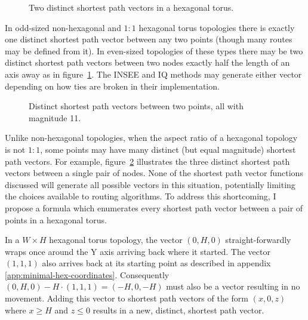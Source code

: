 			\begin{figure}
				\center
				
				\caption{Two distinct shortest path vectors in a hexagonal torus.}
				\label{fig:wrap-alternatives}
			\end{figure}
			
			In odd-sized non-hexagonal and $1:1$ hexagonal torus topologies there is
			exactly one distinct shortest path vector between any two points (though
			many routes may be defined from it). In even-sized topologies of these
			types there may be two distinct shortest path vectors between two nodes
			exactly half the length of an axis away as in
			figure~\ref{fig:wrap-alternatives}. The INSEE and IQ methods may generate
			either vector depending on how ties are broken in their implementation.
			
			\begin{figure}
				\center
				
				\caption[Distinct shortest path vectors in non-square topologies.]%
				{Distinct shortest path vectors between two points, all with
				magnitude 11.}
				\label{fig:spiralling}
			\end{figure}
			
			Unlike non-hexagonal topologies, when the aspect ratio of a hexagonal
			topology is not $1:1$, some points may have many distinct (but equal
			magnitude) shortest path vectors.  For example, figure~\ref{fig:spiralling} illustrates the three distinct shortest path vectors
			between a single pair of nodes. None of the shortest path vector
			functions discussed will generate all possible vectors in this situation,
			potentially limiting the choices available to routing algorithms.  To
			address this shortcoming, I propose a formula which enumerates every
			shortest path vector between a pair of points in a hexagonal torus.
			
			In a $W \times H$ hexagonal torus topology, the vector $(0, H, 0)$
			straight-forwardly wraps once around the Y axis arriving back where it
			started. The vector $(1,1,1)$ also arrives back at its starting point as
			described in appendix \ref{app:minimal-hex-coordinates}. Consequently
			$(0,H,0) - H\cdot(1,1,1) = (-H, 0, -H)$ must also be a vector resulting
			in no movement.  Adding this vector to shortest path vectors of the form
			$(x, 0, z)$ where $x\ge H$ and $z\le0$ results in a new, distinct,
			shortest path vector.
			
